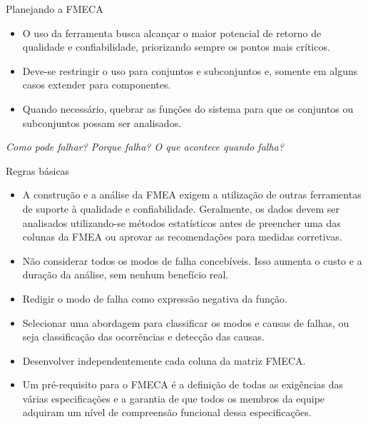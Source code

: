 \documentclass[aspectratio=169]{beamer}
\begin{document}
\begin{frame}[t]{Planejando a FMECA}
    \begin{itemize}
            \item O uso da ferramenta busca alcançar o maior potencial de retorno de qualidade e confiabilidade, priorizando sempre os pontos mais críticos.
            \item Deve-se restringir o uso para conjuntos e subconjuntos e, somente em alguns casos extender para componentes.
            \item Quando necessário, quebrar as funções do sistema para que os conjuntos ou subconjuntos possam ser analisados.
    \end{itemize}
    \vspace{1cm}
    \hspace*{0.5cm}\emph{Como pode falhar? Porque falha? O que acontece quando falha?}
%
\end{frame}
\begin{frame}[t]{Regras básicas}
    \begin{itemize}
            \item A construção e a análise da FMEA exigem a utilização de outras ferramentas de suporte à qualidade e confiabilidade. Geralmente, os dados devem ser analisados utilizando-se métodos estatísticos antes de preencher uma das colunas da FMEA ou aprovar as recomendações para medidas corretivas.
            \item Não considerar todos os modos de falha concebíveis. Isso aumenta o custo e a duração da análise, sem nenhum benefício real.
            \item Redigir o modo de falha como expressão negativa da função.
            \item Selecionar uma abordagem para classificar os modos e causas de falhas, ou seja classificação das ocorrências e detecção das causas.
            \item Desenvolver independentemente cada coluna da matriz FMECA.
            \item Um pré-requisito para o FMECA é a definição de todas as exigências das várias especificações e a garantia de que todos os membros da equipe adquiram um nível de compreensão funcional dessa especificações.
    \end{itemize}
\end{frame}
\end{document}
